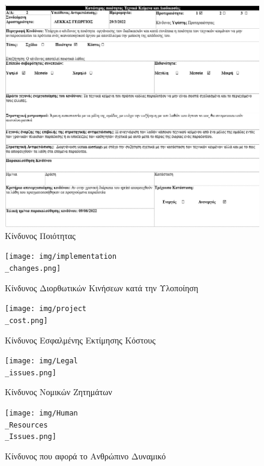 \documentclass{../ol-softwaremanual}
\begin{document}
	\begin{figure}[htbp!]
		\includegraphics[scale=0.9]{img/bad_quality.png}
		\caption{Κίνδυνος Ποιότητας}
	\end{figure}
	
	\newpage
	
	\begin{figure}[htbp!]
		\texttt{[image: img/implementation\\\_changes.png]}
		\caption{Κίνδυνος Διορθωτικών Κινήσεων κατά την Υλοποίηση}
	\end{figure}
	
	
	
	\newpage
	
	\begin{figure}[htbp!]
		\texttt{[image: img/project\\\_cost.png]}
		\caption{Κίνδυνος Εσφαλμένης Εκτίμησης Κόστους}
	\end{figure}
	
	\newpage
	
	\begin{figure}[htbp!]
		\texttt{[image: img/Legal\\\_issues.png]}
		\caption{Κίνδυνος Νομικών Ζητημάτων}
	\end{figure}
	
	
	\newpage
	
	\begin{figure}[htbp!]
		\texttt{[image: img/Human\\\_Resources\\\_Issues.png]}
		\caption{Kίνδυνος που αφορά το Ανθρώπινο Δυναμικό}
	\end{figure}
	
\end{document}

